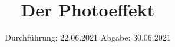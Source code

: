 

\subject{V500}
\title{Der Photoeffekt}
\date{%
  Durchführung: 22.06.2021
  \hspace{3em}
  Abgabe: 30.06.2021
}



\maketitle
\thispagestyle{empty}
\tableofcontents
\newpage







\printbibliography{}


